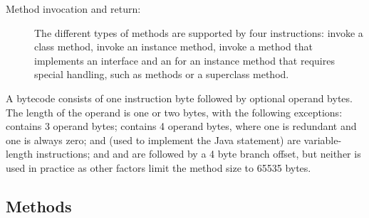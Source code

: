 \begin{description}
    \item[Method invocation and return:]
The different types of methods are supported by four instructions:
invoke a class method, invoke an instance method, invoke a method
that implements an interface and an  for an
instance method that requires special handling, such as
 methods or a superclass method.


\end{description}
%
A bytecode consists of one instruction byte followed by optional
operand bytes. The length of the operand is one or two bytes, with
the following exceptions:  contains 3 operand
bytes;  contains 4 operand bytes, where one is
redundant and one is always zero;  and
 (used to implement the Java 
statement) are variable-length instructions; and  and
 are followed by a 4 byte branch offset, but neither is
used in practice as other factors limit the method size to 65535
bytes.

\subsection{Methods}

